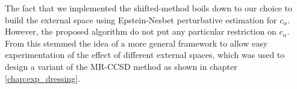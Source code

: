 \documentclass[./thesis.tex]{subfiles}
\begin{document}
The fact that we implemented the shifted-\Bk method boils down to our choice to build the external space using Epstein-Nesbet perturbative estimation for $c_\alpha$. However, the proposed algorithm do not put any particular restriction on $c_\alpha$. From this stemmed the idea of a more general framework to allow easy experimentation of the effect of different external spaces, which was used to design a \alert{variant} of the MR-CCSD method as shown in chapter \ref{chap:exp_dressing}.
\end{document}
